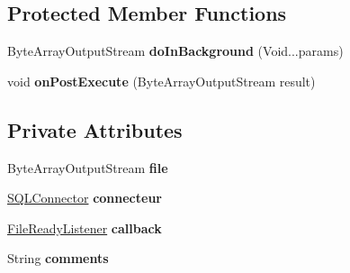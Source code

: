 \subsection*{Protected Member Functions}
\begin{DoxyCompactItemize}
\item 
\hypertarget{classcom_1_1qualoutdoor_1_1recorder_1_1persistent_1_1FileGenerator_acb64785cc5ed8c10d178d9b8ef19542b}{Byte\-Array\-Output\-Stream {\bfseries do\-In\-Background} (Void...\-params)}\label{classcom_1_1qualoutdoor_1_1recorder_1_1persistent_1_1FileGenerator_acb64785cc5ed8c10d178d9b8ef19542b}

\item 
\hypertarget{classcom_1_1qualoutdoor_1_1recorder_1_1persistent_1_1FileGenerator_add0a3e7fab9ff0b41623ba7e349b4131}{void {\bfseries on\-Post\-Execute} (Byte\-Array\-Output\-Stream result)}\label{classcom_1_1qualoutdoor_1_1recorder_1_1persistent_1_1FileGenerator_add0a3e7fab9ff0b41623ba7e349b4131}

\end{DoxyCompactItemize}
\subsection*{Private Attributes}
\begin{DoxyCompactItemize}
\item 
\hypertarget{classcom_1_1qualoutdoor_1_1recorder_1_1persistent_1_1FileGenerator_aede42276d268b738a80707bbae75f4c4}{Byte\-Array\-Output\-Stream {\bfseries file}}\label{classcom_1_1qualoutdoor_1_1recorder_1_1persistent_1_1FileGenerator_aede42276d268b738a80707bbae75f4c4}

\item 
\hypertarget{classcom_1_1qualoutdoor_1_1recorder_1_1persistent_1_1FileGenerator_ae9979f36fe9cc70549c36e882efe95b9}{\hyperlink{classcom_1_1qualoutdoor_1_1recorder_1_1persistent_1_1SQLConnector}{S\-Q\-L\-Connector} {\bfseries connecteur}}\label{classcom_1_1qualoutdoor_1_1recorder_1_1persistent_1_1FileGenerator_ae9979f36fe9cc70549c36e882efe95b9}

\item 
\hypertarget{classcom_1_1qualoutdoor_1_1recorder_1_1persistent_1_1FileGenerator_aa6b1326ceb7ee3fea7029f2007cc87cb}{\hyperlink{interfacecom_1_1qualoutdoor_1_1recorder_1_1persistent_1_1FileReadyListener}{File\-Ready\-Listener} {\bfseries callback}}\label{classcom_1_1qualoutdoor_1_1recorder_1_1persistent_1_1FileGenerator_aa6b1326ceb7ee3fea7029f2007cc87cb}

\item 
\hypertarget{classcom_1_1qualoutdoor_1_1recorder_1_1persistent_1_1FileGenerator_a0e680c58f57545c54fb3c8a7e2797121}{String {\bfseries comments}}\label{classcom_1_1qualoutdoor_1_1recorder_1_1persistent_1_1FileGenerator_a0e680c58f57545c54fb3c8a7e2797121}

\end{DoxyCompactItemize}


